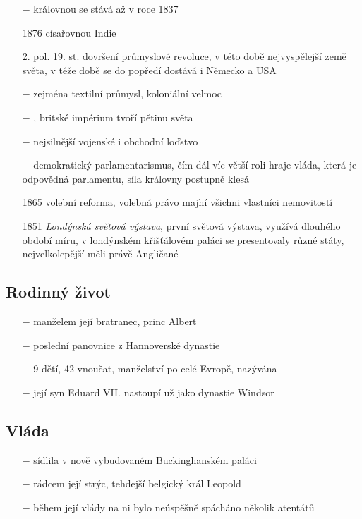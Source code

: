 \documentclass{article}
\begin{document}
\begin{itemize}
    \vspace{-0.5em}
    \setlength\itemsep{0.15em}
    \item[$-$] královnou se stává až v roce 1837
    \item[1876] císařovnou Indie
    \item[2. pol. 19. st.] dovršení průmyslové revoluce, v této době nejvyspělejší země světa, v téže době se do popředí dostává i Německo a USA
    \item[$-$] zejména textilní průmysl, koloniální velmoc
    \item[$-$] , britské impérium tvoří pětinu světa
    \item[$-$] nejsilnější vojenské i obchodní loďstvo
    \item[$-$] demokratický parlamentarismus, čím dál víc větší roli hraje vláda, která je odpovědná parlamentu, síla královny postupně klesá
    \item[1865] volební reforma, volebná právo majhí všichni vlastníci nemovitostí
    \item[1851] \textit{Londýnská světová výstava}, první světová výstava, využívá dlouhého období míru, v londýnském křišťálovém paláci se presentovaly různé státy, nejvelkolepější měli právě Angličané
\end{itemize}

\subsection*{Rodinný život}
\begin{itemize}
    \vspace{-0.5em}
    \setlength\itemsep{0.15em}
    \item[$-$] manželem její bratranec, princ Albert
    \item[$-$] poslední panovnice z Hannoverské dynastie
    \item[$-$] 9 dětí, 42 vnoučat, manželství po celé Evropě, nazývána 
    \item[$-$] její syn Eduard VII. nastoupí už jako dynastie Windsor
\end{itemize}

\subsection*{Vláda}
\begin{itemize}
    \vspace{-0.5em}
    \setlength\itemsep{0.15em}
    \item[$-$] sídlila v nově vybudovaném Buckinghanském paláci
    \item[$-$] rádcem její strýc, tehdejší belgický král Leopold
    \item[$-$] během její vlády na ni bylo neúspěšně spácháno několik atentátů
\end{itemize}
\end{document}
